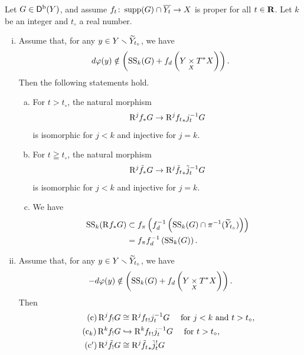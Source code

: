 \begin{Proposition+}
  Let \(G\in\Dompb(Y)\), and assume \(
    f_{t}\colon \supp(G)\cap \overline{Y_t}\to X
  \) is proper for all \(t\in\rr\). 
  Let \(k\) be an integer and \(t_\circ\) a real number.
  \begin{enumerate}[(i)]
    \item Assume that, 
    for any \(y\in Y\smi \widetilde{Y}_{t_{\circ}}\), 
    we have \[
      d\varphi(y)\notin \left(
        \muS[k](G)+ \mdiff[f]\left(
          Y\pb[X]\cotb[X]
        \right)
      \right).
    \]
    Then the following statements hold.
    \begin{enumerate}[(a)]
        \item For \(t>t_\circ\), the natural morphism
        \[
          \Rder[j]{f_{\ast}}G \to \Rder[j]{{f_{t}}_{\ast}}j^{-1}_{t}G
        \]
        is isomorphic for \(j<k\) and injective for \(j=k\). 
        \item[(a\('\))] For \(t\geqq t_\circ\), the natural morphism
        \[
          \Rder[j]{\tilde{f}_{\ast}}G 
          \to 
          \Rder[j]\tilde{f_{t}}_{\ast}\tilde{j}^{-1}_{t}G
        \]
        is isomorphic for \(j<k\) and injective for \(j=k\). 
        \item We have \begin{align*}
          \muS[k](\Rder[]{f_{\ast}}G)
          &\subset
          \mpb[f]\left(\mdiff[f]^{-1}\left(
            \muS[k](G)\cap \pi^{-1}(\widetilde{Y}_{t_{\circ}})
          \right)\right)\\
          &=\mpb[f]\mdiff[f]^{-1}\left(
          \muS[k](G)
          \right).
        \end{align*}
    \end{enumerate}
    \item Assume that, 
    for any \(y\in Y\smi \widetilde{Y}_{t_{\circ}}\), 
    we have \[
      -d\varphi(y)\notin \left(
        \muS[k](G)+ \mdiff[f]\left(
          Y\pb[X]\cotb[X]
        \right)
      \right).
    \]
    Then \begin{align}
      \tag{c}
      \Rder[j]{f_{!}}G
      &\cong
      \Rder[j]{{f_{t}}_{!}}j^{-1}_{t}G
      \quad
      \text{ for \(j<k\) and \(t>t_\circ\)},\\
      \tag{c\(_k\)}
      \Rder[k]{f_{!}}G
      &\hookrightarrow
      \Rder[k]{{f_{t}}_{!}}j^{-1}_{t}G
      \quad
      \text{ for \(t>t_\circ\)},\\
      \tag{c\('\)}
      \Rder[j]{\tilde{f}_{!}}G
      &\cong
      \Rder[j]\tilde{f_{t}}_{\ast}\tilde{j}^{!}_{t}G

\end{align}
\end{enumerate}
\end{Proposition+}
